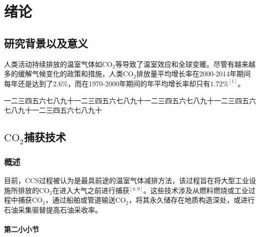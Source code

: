 \chapter{绪\quad 论}

\section{研究背景以及意义}

人类活动持续排放的温室气体如$\text{CO}_2$等导致了温室效应和全球变暖。尽管有越来越多的缓解气候变化的政策和措施，人类$\text{CO}_2$排放量平均增长率在2000-2014年期间每年还是达到了$2.6{\%}$，而在1970-2000年期间的年平均增长率却只有$1.72{\%}^{[1]}$。

一二三四五六七八九十一二三四五六七八九十一二三四五六七八九十一二三四五六七八九十一二三四五六七八九十

\section{$\text{CO}_2$捕获技术}

\subsection{概述}

目前，CCS过程被认为是最具前途的温室气体减排方法，该过程旨在将大型工业设施所排放的$\text{CO}_2$在进入大气之前进行捕获$^{[8 , 9]}$。这些技术涉及从燃料燃烧或工业过程中捕获$\text{CO}_2$，通过船舶或管道输送$\text{CO}_2$，将其永久储存在地质构造深处，或进行石油采集驱替提高石油采收率。

\subsubsection{第二小小节}
